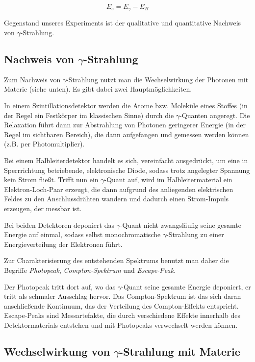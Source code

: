 \documentclass[a4paper,german,12pt,smallheadings]{scrartcl}
\begin{document}
\begin{equation}
  E_e = E_\gamma - E_B
\end{equation}

Gegenstand unseres Experiments ist der qualitative und quantitative Nachweis
von $\gamma$-Strahlung.

\subsection{Nachweis von $\gamma$-Strahlung}

Zum Nachweis von $\gamma$-Strahlung nutzt man die Wechselwirkung der Photonen
mit Materie (siehe unten). Es gibt dabei zwei Hauptmöglichkeiten.

In einem Szintillationsdetektor werden die Atome bzw. Moleküle eines Stoffes
(in der Regel ein Festkörper im klassischen Sinne) durch die $\gamma$-Quanten
angeregt. Die Relaxation führt dann zur Abstrahlung von Photonen geringerer
Energie (in der Regel im sichtbaren Bereich), die dann aufgefangen und gemessen
werden können (z.B. per Photomultiplier).

Bei einem Halbleiterdetektor handelt es sich, vereinfacht ausgedrückt, um eine
in Sperrrichtung betriebende, elektronische Diode, sodass trotz angelegter
Spannung kein Strom fließt. Trifft nun ein $\gamma$-Quant auf, wird im
Halbleitermaterial ein Elektron-Loch-Paar erzeugt, die dann aufgrund des
anliegenden elektrischen Feldes zu den Anschlussdrähten wandern und dadurch
einen Strom-Impuls erzeugen, der messbar ist.

Bei beiden Detektoren deponiert das $\gamma$-Quant nicht zwangsläufig seine
gesamte Energie auf einmal, sodass selbst monochromatische $\gamma$-Strahlung
zu einer Energieverteilung der Elektronen führt.

Zur Charakterisierung des entstehenden Spektrums benutzt man daher die Begriffe
\textit{Photopeak}, \textit{Compton-Spektrum} und \textit{Escape-Peak}.

Der Photopeak tritt dort auf, wo das $\gamma$-Quant seine gesamte Energie
deponiert, er tritt als schmaler Ausschlag hervor. Das Compton-Spektrum ist das
sich daran anschließende Kontinuum, das der Verteilung des Compton-Effekts
entspricht. Escape-Peaks sind Messartefakte, die durch verschiedene Effekte
innerhalb des Detektormaterials entstehen und mit Photopeaks verwechselt werden
können.

\subsection{Wechselwirkung von $\gamma$-Strahlung mit Materie}
\end{document}
